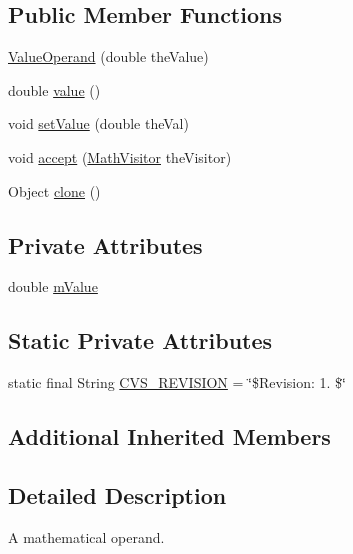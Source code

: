 \subsection*{Public Member Functions}
\begin{DoxyCompactItemize}
\item 
\hyperlink{classexamples_1_1math_1_1cmd_1_1_value_operand_a6636189aceb74ea52cbc164fff408c98}{Value\-Operand} (double the\-Value)
\item 
double \hyperlink{classexamples_1_1math_1_1cmd_1_1_value_operand_a6173165dba75592553e0310a24f3b2ca}{value} ()
\item 
void \hyperlink{classexamples_1_1math_1_1cmd_1_1_value_operand_ab78e8a896c3a164278a5c851a90232e8}{set\-Value} (double the\-Val)
\item 
void \hyperlink{classexamples_1_1math_1_1cmd_1_1_value_operand_a38c7432021a2272360cbe8119e22942c}{accept} (\hyperlink{interfaceexamples_1_1math_1_1_math_visitor}{Math\-Visitor} the\-Visitor)
\item 
Object \hyperlink{classexamples_1_1math_1_1cmd_1_1_value_operand_a261a9089b182fd0d8f92e1c161d2f4b5}{clone} ()
\end{DoxyCompactItemize}
\subsection*{Private Attributes}
\begin{DoxyCompactItemize}
\item 
double \hyperlink{classexamples_1_1math_1_1cmd_1_1_value_operand_a1b92e1db71532f1e9fc4d01ad004a6ab}{m\-Value}
\end{DoxyCompactItemize}
\subsection*{Static Private Attributes}
\begin{DoxyCompactItemize}
\item 
static final String \hyperlink{classexamples_1_1math_1_1cmd_1_1_value_operand_ab9c7e8e52d26c4daca70ad88d29fd6ec}{C\-V\-S\-\_\-\-R\-E\-V\-I\-S\-I\-O\-N} = \char`\"{}\$Revision\-: 1. \$\char`\"{}
\end{DoxyCompactItemize}
\subsection*{Additional Inherited Members}


\subsection{Detailed Description}
A mathematical operand.


